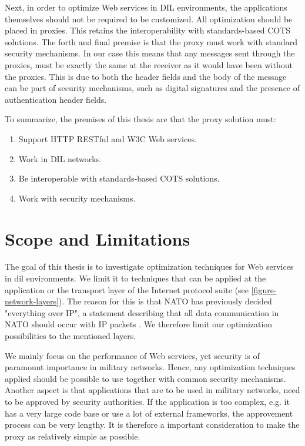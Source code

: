 Next, in order to optimize Web services in DIL environments, the applications
themselves should not be required to be customized. All optimization should be
placed in proxies. This retains the interoperability with standards-based COTS
solutions. The forth and final premise is that the proxy must work with standard
security mechanisms. In our case this means that any messages sent through the
proxies, must be exactly the same at the receiver as it would have been without
the proxies. This is due to both the header fields and the body of the message
can be part of security mechanisms, such as digital signatures and the presence
of authentication header fields.

To summarize, the premises of this thesis are that the proxy solution must:

\begin{enumerate}
    \item Support HTTP RESTful and W3C Web services.
    \item Work in DIL networks.
    \item Be interoperable with standards-based COTS solutions.
    \item Work with security mechanisms.
\end{enumerate}

\section{Scope and Limitations}

The goal of this thesis is to investigate optimization techniques for Web
services in \gls{dil} environments. We limit it to techniques that can be
applied at the application or the transport layer of the Internet protocol
suite (see \cref{figure-network-layers}). The reason for this is that NATO has
previously decided "everything over IP", a statement describing that all data
communication in NATO should occur with IP packets \cite{nnec-study}. We
therefore limit our optimization possibilities to the mentioned layers.

We mainly focus on the performance of Web services, yet security is of paramount
importance in military networks. Hence, any optimization techniques applied
should be possible to use together with common security mechanisms. Another
aspect is that applications that are to be used in military networks, need to be
approved by security authorities. If the application is too complex, e.g. it has
a very large code base or use a lot of external frameworks, the approvement
process can be very lengthy. It is therefore a important consideration to make
the proxy as relatively simple as possible.


